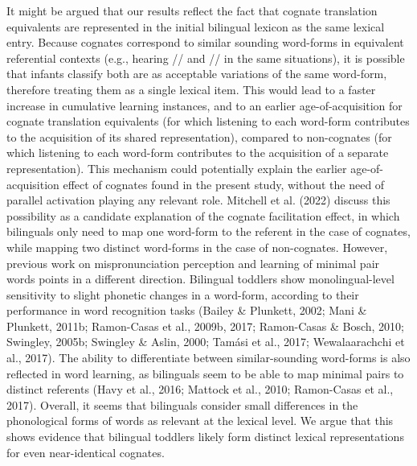 \documentclass[
  12pt,
  b5paperpaper,
  twoside]{scrreprt}
\begin{document}
It might be argued that our results reflect the fact that cognate
translation equivalents are represented in the initial bilingual lexicon
as the same lexical entry. Because cognates correspond to similar
sounding word-forms in equivalent referential contexts (e.g., hearing
// and // in the same situations), it is
possible that infants classify both are as acceptable variations of the
same word-form, therefore treating them as a single lexical item. This
would lead to a faster increase in cumulative learning instances, and to
an earlier age-of-acquisition for cognate translation equivalents (for
which listening to each word-form contributes to the acquisition of its
shared representation), compared to non-cognates (for which listening to
each word-form contributes to the acquisition of a separate
representation). This mechanism could potentially explain the earlier
age-of-acquisition effect of cognates found in the present study,
without the need of parallel activation playing any relevant role.
Mitchell et al. (2022) discuss this possibility as a candidate
explanation of the cognate facilitation effect, in which bilinguals only
need to map one word-form to the referent in the case of cognates, while
mapping two distinct word-forms in the case of non-cognates. However,
previous work on mispronunciation perception and learning of minimal
pair words points in a different direction. Bilingual toddlers show
monolingual-level sensitivity to slight phonetic changes in a word-form,
according to their performance in word recognition tasks (Bailey \&
Plunkett, 2002; Mani \& Plunkett, 2011b; Ramon-Casas et al., 2009b,
2017; Ramon-Casas \& Bosch, 2010; Swingley, 2005b; Swingley \& Aslin,
2000; Tamási et al., 2017; Wewalaarachchi et al., 2017). The ability to
differentiate between similar-sounding word-forms is also reflected in
word learning, as bilinguals seem to be able to map minimal pairs to
distinct referents (Havy et al., 2016; Mattock et al., 2010; Ramon-Casas
et al., 2017). Overall, it seems that bilinguals consider small
differences in the phonological forms of words as relevant at the
lexical level. We argue that this shows evidence that bilingual toddlers
likely form distinct lexical representations for even near-identical
cognates.
\end{document}

